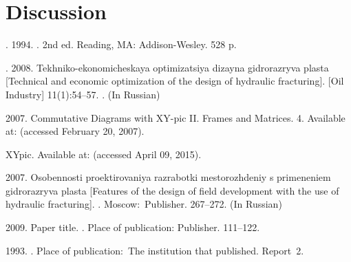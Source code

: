 \documentclass[12pt, twoside]{article}
\begin{document}
\section{Discussion}

\begin{thebibliography}{99}

	. 1994.
	.
	2nd ed.
	Reading, MA: Addison-Wesley. 528 p.

	. 2008.
	Tekhniko-ekonomicheskaya optimizatsiya dizayna gidrorazryva plasta
	[Technical and economic optimization of the design of hydraulic fracturing].
	 [Oil Industry] 11(1):54--57.
	. (In Russian)

	 2007.
	Commutative Diagrams with XY-pic II. Frames and Matrices.
	  4.
	Available at: 
    (accessed February 20, 2007).

	XYpic.
	Available at: 
	(accessed April 09, 2015).

	 2007.
	Osobennosti proektirovaniya razrabotki mestorozhdeniy s primeneniem gidrorazryva plasta
	[Features of the design of field development with the use of hydraulic fracturing].
	.
	Moscow:~Publisher. 267--272. (In Russian)
	   	
     2009.
    Paper title.
    .
    Place of publication: Publisher. 111--122.
	
	 1993.
  	.
  	Place of publication:~The institution that published.  Report~2.
  	     	
\end{thebibliography}
\end{document}
